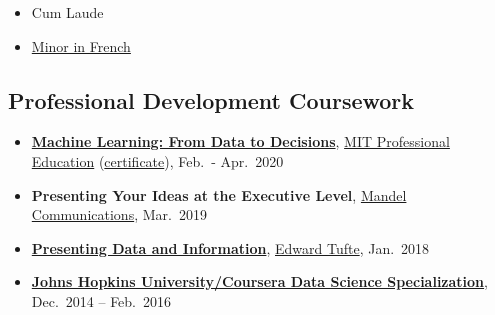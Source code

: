\documentclass[
]{article}
\providecommand{\tightlist}{%
  \setlength{\itemsep}{0pt}\setlength{\parskip}{0pt}}
\begin{document}
\begin{itemize}
\tightlist
\item
  Cum Laude
\item
  \href{https://www.depts.ttu.edu/classic_modern/french/frenchminor.php}{Minor
  in French}
\end{itemize}

\hypertarget{professional-development-coursework}{%
\subsection{Professional Development
Coursework}\label{professional-development-coursework}}

\begin{itemize}
\tightlist
\item
  \href{https://professional.mit.edu/course-catalog/machine-learning-data-decisions-english}{\textbf{Machine
  Learning: From Data to Decisions}},
  \href{https://professional.mit.edu/}{MIT Professional Education}
  (\href{https://www.credential.net/320eb5b5-cb8b-4b6f-bd68-8f4070bb8b9a}{certificate}),
  Feb.~- Apr.~2020
\item
  \textbf{Presenting Your Ideas at the Executive Level},
  \href{https://www.mandel.com/}{Mandel Communications}, Mar.~2019
\item
  \href{https://www.edwardtufte.com/tufte/courses}{\textbf{Presenting
  Data and Information}}, \href{https://www.edwardtufte.com/}{Edward
  Tufte}, Jan.~2018
\item
  \href{https://www.coursera.org/specializations/jhu-data-science}{\textbf{Johns
  Hopkins University/Coursera Data Science Specialization}}, Dec.~2014
  -- Feb.~2016


\end{itemize}
\end{document}
